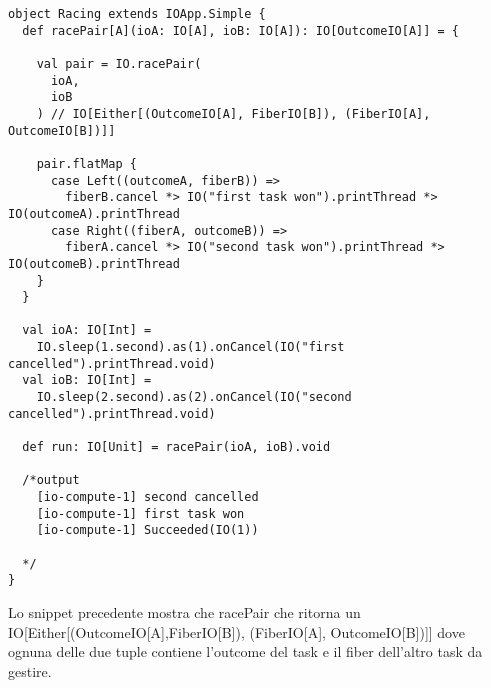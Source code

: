 \begin{verbatim}
object Racing extends IOApp.Simple {
  def racePair[A](ioA: IO[A], ioB: IO[A]): IO[OutcomeIO[A]] = {

    val pair = IO.racePair(
      ioA,
      ioB
    ) // IO[Either[(OutcomeIO[A], FiberIO[B]), (FiberIO[A], OutcomeIO[B])]]

    pair.flatMap {
      case Left((outcomeA, fiberB)) =>
        fiberB.cancel *> IO("first task won").printThread *> IO(outcomeA).printThread
      case Right((fiberA, outcomeB)) =>
        fiberA.cancel *> IO("second task won").printThread *> IO(outcomeB).printThread
    }
  }

  val ioA: IO[Int] =
    IO.sleep(1.second).as(1).onCancel(IO("first cancelled").printThread.void)
  val ioB: IO[Int] =
    IO.sleep(2.second).as(2).onCancel(IO("second cancelled").printThread.void)

  def run: IO[Unit] = racePair(ioA, ioB).void

  /*output
    [io-compute-1] second cancelled
    [io-compute-1] first task won
    [io-compute-1] Succeeded(IO(1))

  */
}

\end{verbatim}

Lo snippet precedente mostra che racePair che ritorna un IO[Either[(OutcomeIO[A],FiberIO[B]), (FiberIO[A], OutcomeIO[B])]] dove ognuna delle due tuple contiene l’outcome del task e il fiber dell’altro task da gestire.
